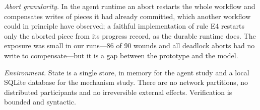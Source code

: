\emph{Abort granularity.} In the agent runtime an abort restarts the whole
workflow and compensates writes of pieces it had already committed, which
another workflow could in principle have observed; a faithful implementation
of rule E4 restarts only the aborted piece from its progress record, as the
durable runtime does. The exposure was small in our runs---86 of 90 wounds
and all deadlock aborts had no write to compensate---but it is a gap between
the prototype and the model.

\emph{Environment.} State is a single store, in memory for the agent study
and a local SQLite database for the mechanism study. There are no network
partitions, no distributed participants and no irreversible external effects.
Verification is bounded and syntactic.
